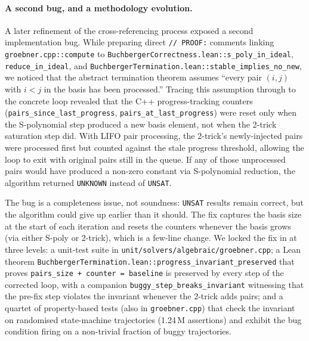 \documentclass[runningheads]{llncs}
\begin{document}
\paragraph{A second bug, and a methodology evolution.}
A later refinement of the cross-referencing process exposed a
second implementation bug. While preparing direct
\texttt{// PROOF:} comments linking
\texttt{groebner.cpp::compute} to
\texttt{BuchbergerCorrectness.lean::s\_poly\_in\_ideal},
\texttt{reduce\_in\_ideal}, and
\texttt{BuchbergerTermination.lean::stable\_implies\_no\_new},
we noticed that the abstract termination theorem assumes
``every pair $(i,j)$ with $i < j$ in the basis has been
processed.'' Tracing this assumption through to the concrete
loop revealed that the C++ progress-tracking counters
(\texttt{pairs\_since\_last\_progress},
\texttt{pairs\_at\_last\_progress}) were reset only when the
S-polynomial step produced a new basis element, not when the
2-trick saturation step did. With LIFO pair processing, the
2-trick's newly-injected pairs were processed first but counted
against the stale progress threshold, allowing the loop to exit
with original pairs still in the queue. If any of those
unprocessed pairs would have produced a non-zero constant via
S-polynomial reduction, the algorithm returned \texttt{UNKNOWN}
instead of \texttt{UNSAT}.

The bug is a completeness issue, not soundness: \texttt{UNSAT}
results remain correct, but the algorithm could give up earlier
than it should. The fix captures the basis size at the start of
each iteration and resets the counters whenever the basis grows
(via either S-poly or 2-trick), which is a few-line change. We
locked the fix in at three levels: a unit-test suite in
\texttt{unit/solvers/algebraic/groebner.cpp}; a Lean theorem
\texttt{BuchbergerTermination.lean::progress\_invariant\_preserved}
that proves \texttt{pairs\_size + counter = baseline} is
preserved by every step of the corrected loop, with a companion
\texttt{buggy\_step\_breaks\_invariant} witnessing that the
pre-fix step violates the invariant whenever the 2-trick adds
pairs; and a quartet of property-based tests (also in
\texttt{groebner.cpp}) that check the invariant on randomised
state-machine trajectories (1.24\,M assertions) and exhibit
the bug condition firing on a non-trivial fraction of buggy
trajectories.
\end{document}
